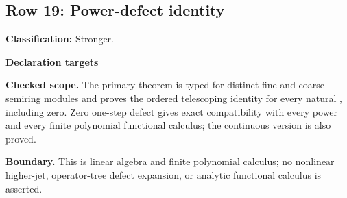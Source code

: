 \subsection{Row 19: Power-defect identity}
\label{row:19}
\textbf{Classification:} Stronger.
\par\smallskip\textbf{Declaration targets}\par
{\small\noindent{}\par}
{\small\noindent{}\par}
{\small\noindent{}\par}
{\small\noindent{}\par}
{\small\noindent{}\par}
{\small\noindent{}\par}
{\small\noindent{}\par}
{\small\noindent{}\par}
\smallskip\textbf{Checked scope.} The primary theorem is typed for distinct fine and coarse semiring modules and proves the ordered telescoping identity for every natural , including zero. Zero one-step defect gives exact compatibility with every power and every finite polynomial functional calculus; the continuous version is also proved.
\par\smallskip\textbf{Boundary.} This is linear algebra and finite polynomial calculus; no nonlinear higher-jet, operator-tree defect expansion, or analytic functional calculus is asserted.
\medskip
{}
